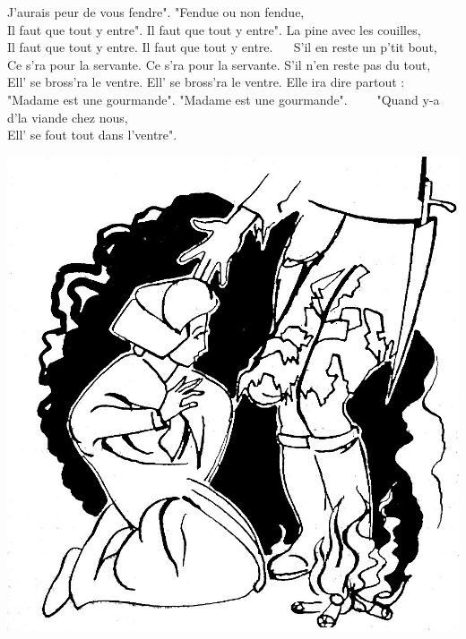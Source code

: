 {J'aurais peur de vous fendre".}
"Fendue ou non fendue,
\\Il faut que tout y entre".
{Il faut que tout y entre".}
La pine avec les couilles,
\\Il faut que tout y entre.
{Il faut que tout y entre. ~~}
S'il en reste un p'tit bout,
\\Ce s'ra pour la servante.
{Ce s'ra pour la servante.}
S'il n'en reste pas du tout,
\\Ell' se bross'ra le ventre.
\breakpage
{}
{Ell' se bross'ra le ventre.}
Elle ira dire partout :
\\"Madame est une gourmande".
{"Madame est une gourmande".~~~~}
"Quand y-a d'la viande chez nous,
\\Ell' se fout tout dans l'ventre".
\\
\bigskip
\begin{center}
\includegraphics[width=1\textwidth]{images/grenadier.jpg}
\end{center}

\breakpage